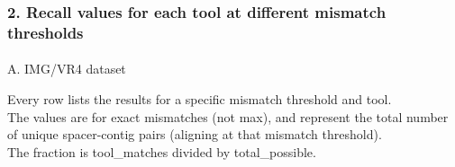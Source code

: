 \documentclass[
]{article}
\makeatletter
\let\oldparagraph\paragraph
\renewcommand{\paragraph}{
    \@ifstar
      \xxxParagraphStar
      \xxxParagraphNoStar
  }
\newcommand{\xxxParagraphStar}[1]{\oldparagraph*{#1}\mbox{}}
\newcommand{\xxxParagraphNoStar}[1]{\oldparagraph{#1}\mbox{}}
\makeatother
\begin{document}
\subsubsection{2. Recall values for each tool at different mismatch
thresholds}\label{recall-values-for-each-tool-at-different-mismatch-thresholds}

\paragraph{A. IMG/VR4 dataset}\label{a.-imgvr4-dataset}

Every row lists the results for a specific mismatch threshold and
tool.\\
The values are for exact mismatches (not max), and represent the total
number of unique spacer-contig pairs (aligning at that mismatch
threshold).\\
The fraction is tool\_matches divided by total\_possible.
\end{document}
